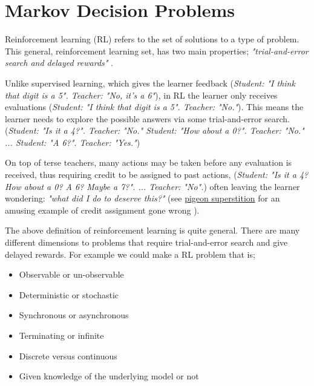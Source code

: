 \chapter{Markov Decision Problems}\label{mdps}

Reinforcement learning (RL) refers to the set of solutions to a type of problem.
This general, reinforcement learning set, has two main properties;
\textit{"trial-and-error search and delayed rewards"} \cite{Sutton2018}.

Unlike supervised learning, which gives the learner feedback (\textit{Student: "I think that digit
is a 5". Teacher: "No, it's a 6"}), in RL the learner only receives evaluations (\textit{Student: "I think
that digit is a 5". Teacher: "No."}). This means the learner needs to explore the possible answers via some trial-and-error search.
(\textit{Student: "Is it a 4?". Teacher: "No." Student: "How about a 0?". Teacher: "No." ... Student: "A 6?". Teacher: "Yes."})

On top of terse teachers, many actions may be taken before any evaluation is received, thus requiring credit to be assigned to past actions,
(\textit{Student: "Is it a 4? How about a 0? A 6? Maybe a 7?". ... Teacher: "No".})
often leaving the learner wondering: \textit{"what did I do to deserve this?"} (see
\href{https://www.youtube.com/watch?v=Qv4H81gEGDQ}{pigeon superstition} for an amusing
example of credit assignment gone wrong \cite{Box1997}).


\vspace{5mm}

The above definition of reinforcement learning is quite general. There are many
different dimensions to problems that require trial-and-error search and give
delayed rewards. For example we could make a RL problem that is;

\begin{itemize}
\tightlist
\item
  Observable or un-observable \cite{Kaelbling1998}
\item
  Deterministic or stochastic \cite{Putterman2015}
\item
  Synchronous or asynchronous \cite{Bertsekas1995}
\item
  Terminating or infinite \cite{Putterman2015}
\item
  Discrete versus continuous \cite{Bertsekas1995}
\item
  Given knowledge of the underlying model or not \cite{Sutton1991}
\end{itemize}

